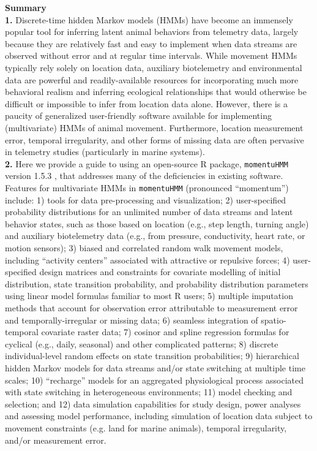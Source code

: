 \documentclass[12pt]{article}\usepackage[]{graphicx}\usepackage[]{color}
\begin{document}
\noindent \textbf{Summary}\\
\textbf{1.} Discrete-time hidden Markov models (HMMs) have become an immensely popular tool for inferring latent animal behaviors from telemetry data, largely because they are relatively fast and easy to implement when data streams are observed without error and at regular time intervals. While movement HMMs typically rely solely on location data, auxiliary biotelemetry and environmental data are powerful and readily-available resources for incorporating much more behavioral realism and inferring ecological relationships that would otherwise be difficult or impossible to infer from location data alone.  However, there is a paucity of generalized user-friendly software available for implementing (multivariate) HMMs of animal movement. Furthermore, location measurement error, temporal irregularity, and other forms of missing data are often pervasive in telemetry studies (particularly in marine systems).\\ %
\textbf{2.} Here we provide a guide to using an open-source R package, \verb|momentuHMM| version 1.5.3%
, that addresses many of the deficiencies in existing software.  Features for multivariate HMMs in \verb|momentuHMM| (pronounced ``momentum'') include: 1) tools for data pre-processing and visualization; 2) user-specified probability distributions for an unlimited number of data streams and latent behavior states, such as those based on location (e.g., step length, turning angle) and auxiliary biotelemetry data (e.g., from pressure, conductivity, heart rate, or motion sensors); 3) biased and correlated random walk movement models, including ``activity centers'' associated with attractive or repulsive forces; 4) user-specified design matrices and constraints for covariate modelling of initial distribution, state transition probability, and probability distribution parameters using linear model formulas familiar to most R users; 5) multiple imputation methods that account for observation error attributable to measurement error and temporally-irregular or missing data; 6) seamless integration of spatio-temporal covariate raster data; 7) cosinor and spline regression formulas for cyclical (e.g., daily, seasonal) and other complicated patterns; 8) discrete individual-level random effects on state transition probabilities; 9) hierarchical hidden Markov models for data streams and/or state switching at multiple time scales; 10) ``recharge'' models for an aggregated physiological process associated with state switching in heterogeneous environments; 11) model checking and selection; and 12) data simulation capabilities for study design, power analyses and assessing model performance, including simulation of location data subject to movement constraints (e.g. land for marine animals), temporal irregularity, and/or measurement error.\\ 
\end{document}
